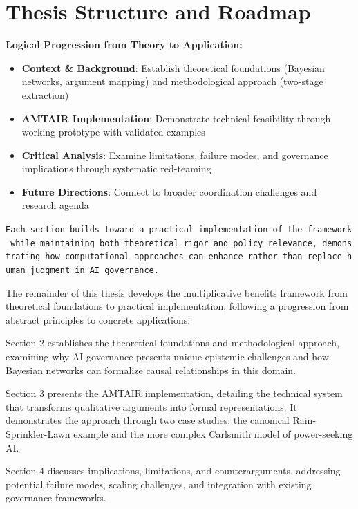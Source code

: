 \documentclass[
  11pt,
  letterpaper,
]{book}
\providecommand{\tightlist}{%
  \setlength{\itemsep}{0pt}\setlength{\parskip}{0pt}}
\begin{document}
\section{Thesis Structure and Roadmap}\label{sec-roadmap}

\textbf{Logical Progression from Theory to Application:}

\begin{itemize}
\tightlist
\item
  \textbf{Context \& Background}: Establish theoretical foundations
  (Bayesian networks, argument mapping) and methodological approach
  (two-stage extraction)
\item
  \textbf{AMTAIR Implementation}: Demonstrate technical feasibility
  through working prototype with validated examples
\item
  \textbf{Critical Analysis}: Examine limitations, failure modes, and
  governance implications through systematic red-teaming
\item
  \textbf{Future Directions}: Connect to broader coordination challenges
  and research agenda
\end{itemize}

\texttt{Each\ section\ builds\ toward\ a\ practical\ implementation\ of\ the\ framework\ while\ maintaining\ both\ theoretical\ rigor\ and\ policy\ relevance,\ demonstrating\ how\ computational\ approaches\ can\ enhance\ rather\ than\ replace\ human\ judgment\ in\ AI\ governance.}

The remainder of this thesis develops the multiplicative benefits
framework from theoretical foundations to practical implementation,
following a progression from abstract principles to concrete
applications:

Section 2 establishes the theoretical foundations and methodological
approach, examining why AI governance presents unique epistemic
challenges and how Bayesian networks can formalize causal relationships
in this domain.

Section 3 presents the AMTAIR implementation, detailing the technical
system that transforms qualitative arguments into formal
representations. It demonstrates the approach through two case studies:
the canonical Rain-Sprinkler-Lawn example and the more complex Carlsmith
model of power-seeking AI.

Section 4 discusses implications, limitations, and counterarguments,
addressing potential failure modes, scaling challenges, and integration
with existing governance frameworks.
\end{document}
